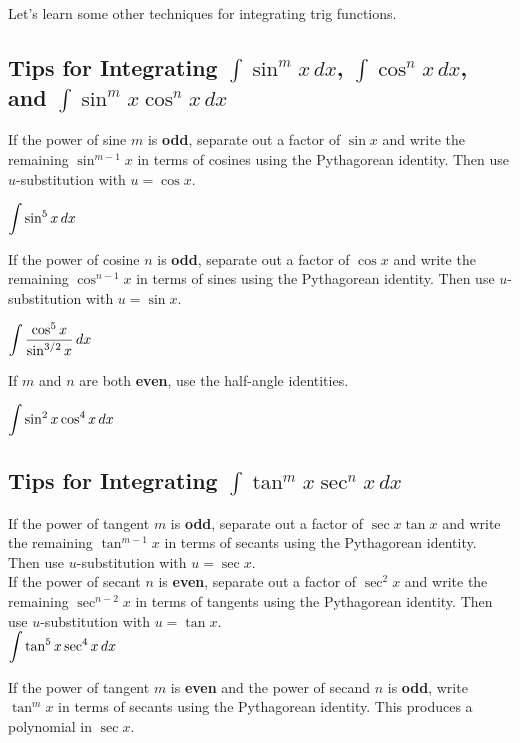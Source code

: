 \documentclass[12pt]{article}
\begin{document}
\vfill

Let's learn some other techniques for integrating trig functions.

\newpage

\subsection*{Tips for Integrating $\int\sin^m x\,dx$, $\int\cos^nx\,dx$, and $\int\sin^m x\cos^n x\,dx$}

If the power of sine $m$ is \textbf{odd}, separate out a factor of $\sin x$ and write the remaining $\sin^{m-1}x$ in terms of cosines using the Pythagorean identity. Then use $u$-substitution with $u=\cos x$.

\Example $\displaystyle\int\sin^5 x\,dx$

\vfill

If the power of cosine $n$ is \textbf{odd}, separate out a factor of $\cos x$ and write the remaining $\cos^{n-1}x$ in terms of sines using the Pythagorean identity. Then use $u$-substitution with $u=\sin x$.

\Example $\displaystyle\int\frac{\cos^5 x}{\sin^{3/2}x}\,dx$

\vfill

\newpage

If $m$ and $n$ are both \textbf{even}, use the half-angle identities.

\Example $\displaystyle\int\sin^2x\cos^4x\,dx$

\newpage

\subsection*{Tips for Integrating $\int\tan^m x\sec^nx\,dx$}
%
If the power of tangent $m$ is \textbf{odd}, separate out a factor of $\sec x\tan x$ and write the remaining $\tan^{m-1}x$ in terms of secants using the Pythagorean identity. Then use $u$-substitution with $u=\sec x$.\\

If the power of secant $n$ is \textbf{even}, separate out a factor of $\sec^2x$ and write the remaining $\sec^{n-2}x$ in terms of tangents using the Pythagorean identity. Then use $u$-substitution with $u=\tan x$. \\

\Example $\displaystyle\int\tan^5 x\sec^4x\,dx$

\newpage

If the power of tangent $m$ is \textbf{even} and the power of secand $n$ is \textbf{odd}, write $\tan^m x$ in terms of secants using the Pythagorean identity. This produces a polynomial in $\sec x$. 
\end{document}
